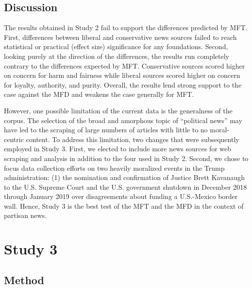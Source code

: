 \documentclass[
  man,floatsintext]{apa6}
\begin{document}
\subsection{Discussion}\label{discussion-1}

The results obtained in Study 2 fail to support the differences
predicted by MFT. First, differences between liberal and conservative
news sources failed to reach statistical or practical (effect size)
significance for any foundations. Second, looking purely at the
direction of the differences, the results run completely contrary to the
differences expected by MFT. Conservative sources scored higher on
concern for harm and fairness while liberal sources scored higher on
concern for loyalty, authority, and purity. Overall, the results lend
strong support to the case against the MFD and weakens the case
generally for MFT.

However, one possible limitation of the current data is the generalness
of the corpus. The selection of the broad and amorphous topic of
``political news'' may have led to the scraping of large numbers of
articles with little to no moral-centric content. To address this
limitation, two changes that were subsequently employed in Study 3.
First, we elected to include more news sources for web scraping and
analysis in addition to the four used in Study 2. Second, we chose to
focus data collection efforts on two heavily moralized events in the
Trump administration: (1) the nomination and confirmation of Justice
Brett Kavanaugh to the U.S. Supreme Court and the U.S. government
shutdown in December 2018 through January 2019 over disagreements about
funding a U.S.-Mexico border wall. Hence, Study 3 is the best test of
the MFT and the MFD in the context of partisan news.

\section{Study 3}\label{study-3}

\subsection{Method}\label{method-2}
\end{document}
